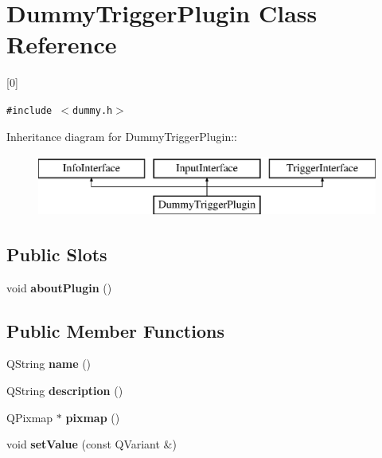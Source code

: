 \hypertarget{class_dummy_trigger_plugin}{
\section{DummyTriggerPlugin Class Reference}
\label{class_dummy_trigger_plugin}
}
\mbox{[}0\mbox{]}  


{\tt \#include $<$dummy.h$>$}

Inheritance diagram for DummyTriggerPlugin::\begin{figure}[H]
\begin{center}
\leavevmode
\includegraphics[height=2cm]{class_dummy_trigger_plugin}
\end{center}
\end{figure}
\subsection*{Public Slots}
\begin{CompactItemize}
\item 
\hypertarget{class_dummy_trigger_plugin_28d7c7c35235043581e531a098c7d568}{
void \textbf{aboutPlugin} ()}
\label{class_dummy_trigger_plugin_28d7c7c35235043581e531a098c7d568}

\end{CompactItemize}
\subsection*{Public Member Functions}
\begin{CompactItemize}
\item 
\hypertarget{class_dummy_trigger_plugin_deae16365fb201605244fbee4dcee5d8}{
QString \textbf{name} ()}
\label{class_dummy_trigger_plugin_deae16365fb201605244fbee4dcee5d8}

\item 
\hypertarget{class_dummy_trigger_plugin_6c4d123d204632ba8e51007c47b2ec6d}{
QString \textbf{description} ()}
\label{class_dummy_trigger_plugin_6c4d123d204632ba8e51007c47b2ec6d}

\item 
\hypertarget{class_dummy_trigger_plugin_35fb7b10d2f9c309790bddb90059171a}{
QPixmap $\ast$ \textbf{pixmap} ()}
\label{class_dummy_trigger_plugin_35fb7b10d2f9c309790bddb90059171a}

\item 
\hypertarget{class_dummy_trigger_plugin_f251abce0a2949ff2596a67d45e08c72}{
void \textbf{setValue} (const QVariant \&)}
\label{class_dummy_trigger_plugin_f251abce0a2949ff2596a67d45e08c72}

\end{CompactItemize}


